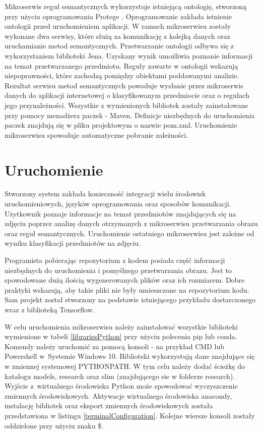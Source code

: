 Mikroserwis reguł semantycznych wykorzystuje istniejącą ontologię, stworzoną przy użyciu oprogramowania Protege \cite{Protege}. Oprogramowanie zakłada istnienie ontologii przed uruchomieniem aplikacji. W ramach mikroserwisu zostały wykonane dwa serwisy, które służą za komunikację z kolejką danych oraz uruchamianie metod semantycznych. Przetwarzanie ontologii odbywa się z wykorzystaniem biblioteki Jena. Uzyskany wynik umożliwia poznanie informacji na temat przetwarzanego przedmiotu. Reguły zawarte w ontologii wskazują niepoprawności, które zachodzą pomiędzy obiektami poddawanymi analizie. Rezultat serwisu metod semantycznych powoduje wysłanie przez mikroserwis danych do aplikacji internetowej o klasyfikowanym przedmiocie oraz o regułach jego przynależności. 
Wszystkie z wymienionych bibliotek zostały zainstalowane przy pomocy menadżera paczek - Maven. Definicje niezbędnych do uruchomienia paczek znajdują się w pliku projektowym o nazwie pom.xml. Uruchomienie mikroserwisu spowoduje automatyczne pobranie zależności.


\section{Uruchomienie}

Stworzony system zakłada konieczność integracji wielu środowisk uruchomieniowych, języków oprogramowania oraz sposobów komunikacji. Użytkownik poznaje informacje na temat przedmiotów znajdujących się na zdjęciu poprzez analizę danych otrzymanych z mikroserwisu przetwarzania obrazu oraz reguł semantycznych. Uruchomienie ostatniego mikroserwisu jest zależne od wyniku klasyfikacji przedmiotów na zdjęciu. 

Programista pobierając repozytorium z kodem posiada część informacji niezbędnych do uruchomienia i pomyślnego przetwarzania obrazu. Jest to spowodowane dużą ilością wygenerowanych plików oraz ich rozmiarem. Dobre praktyki wskazują, aby takie pliki nie były umieszczane na repozytorium kodu. Sam projekt został stworzony na podstawie istniejącego przykładu dostarczonego wraz z biblioteką Tensorflow. 

W celu uruchomienia mikroserwisu należy zainstalować wszystkie biblioteki wymienione w tabeli \ref{librariesPython} przy użyciu polecenia pip lub conda. Komendy należy uruchomić za pomocą konsoli - na przykład CMD lub Powershell\cite{Powershell} w~Systemie Windows 10. Biblioteki wykorzystują dane znajdujące się w zmiennej systemowej PYTHONPATH. W tym celu należy dodać ścieżkę do katalogu models, research oraz slim (znajdującego sie w folderze research). Wyjście z~wirtualnego środowiska Python może spowodować wyczyszczenie zmiennych środowiskowych. Aktywacje wirtualnego środowiska anacondy, instalację bibliotek oraz eksport zmiennych środowiskowych została przedstawiona w listingu \ref{terminalConfiguration}. Kolejne wiersze konsoli zostały oddzielone przy użyciu znaku \$.


